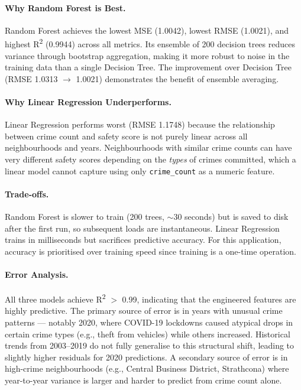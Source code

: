 \documentclass{article}
\begin{document}
\paragraph{Why Random Forest is Best.}
Random Forest achieves the lowest MSE (1.0042), lowest RMSE (1.0021), and highest
R\textsuperscript{2} (0.9944) across all metrics. Its ensemble of 200 decision
trees reduces variance through bootstrap aggregation, making it more robust to
noise in the training data than a single Decision Tree. The improvement over
Decision Tree (RMSE 1.0313 $\rightarrow$ 1.0021) demonstrates the benefit of
ensemble averaging.

\paragraph{Why Linear Regression Underperforms.}
Linear Regression performs worst (RMSE 1.1748) because the relationship between
crime count and safety score is not purely linear across all neighbourhoods and
years. Neighbourhoods with similar crime counts can have very different safety
scores depending on the \emph{types} of crimes committed, which a linear model
cannot capture using only \texttt{crime\_count} as a numeric feature.

\paragraph{Trade-offs.}
Random Forest is slower to train (200 trees, $\sim$30 seconds) but is saved to
disk after the first run, so subsequent loads are instantaneous. Linear Regression
trains in milliseconds but sacrifices predictive accuracy. For this application,
accuracy is prioritised over training speed since training is a one-time operation.

\paragraph{Error Analysis.}
All three models achieve R\textsuperscript{2} $>$ 0.99, indicating that the
engineered features are highly predictive. The primary source of error is in years
with unusual crime patterns --- notably 2020, where COVID-19 lockdowns caused
atypical drops in certain crime types (e.g., theft from vehicles) while others
increased. Historical trends from 2003--2019 do not fully generalise to this
structural shift, leading to slightly higher residuals for 2020 predictions. A
secondary source of error is in high-crime neighbourhoods (e.g., Central Business
District, Strathcona) where year-to-year variance is larger and harder to predict
from crime count alone.
\end{document}
